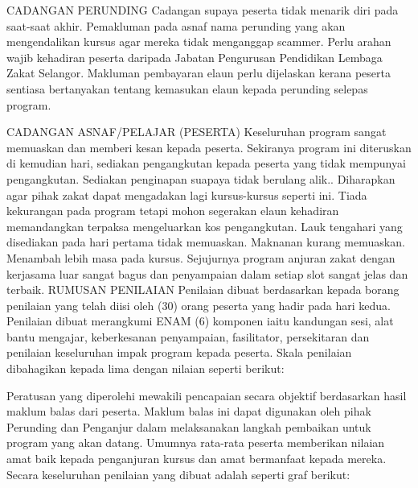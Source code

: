 CADANGAN PERUNDING
Cadangan supaya peserta tidak menarik diri pada saat-saat akhir.
Pemakluman pada asnaf nama perunding yang akan mengendalikan kursus agar mereka tidak menganggap scammer.
Perlu arahan wajib kehadiran peserta daripada Jabatan Pengurusan Pendidikan Lembaga Zakat Selangor.
Makluman pembayaran elaun perlu dijelaskan kerana peserta sentiasa bertanyakan tentang kemasukan elaun kepada perunding selepas program.


CADANGAN ASNAF/PELAJAR (PESERTA)
Keseluruhan program sangat memuaskan dan memberi kesan kepada peserta.
Sekiranya program ini diteruskan di kemudian hari, sediakan pengangkutan kepada peserta yang tidak mempunyai pengangkutan.
Sediakan penginapan suapaya tidak berulang alik..
Diharapkan agar pihak zakat dapat mengadakan lagi kursus-kursus seperti ini.
Tiada kekurangan pada program tetapi mohon segerakan elaun kehadiran memandangkan terpaksa mengeluarkan kos pengangkutan.
Lauk tengahari yang disediakan pada hari pertama tidak memuaskan.
Maknanan kurang memuaskan.
Menambah lebih masa pada kursus.
Sejujurnya program anjuran zakat dengan kerjasama luar sangat bagus dan penyampaian dalam setiap slot sangat jelas dan terbaik.
RUMUSAN PENILAIAN
Penilaian dibuat berdasarkan kepada borang penilaian yang telah diisi oleh (30) orang peserta yang hadir pada hari kedua. Penilaian dibuat merangkumi ENAM (6) komponen iaitu kandungan sesi, alat bantu mengajar, keberkesanan penyampaian, fasilitator, persekitaran dan penilaian keseluruhan impak program kepada peserta. Skala penilaian dibahagikan kepada lima dengan nilaian seperti berikut:

Peratusan yang diperolehi mewakili pencapaian secara objektif berdasarkan hasil maklum balas dari peserta. Maklum balas ini dapat digunakan oleh pihak Perunding dan Penganjur dalam melaksanakan langkah pembaikan untuk program yang akan datang. Umumnya rata-rata peserta memberikan nilaian amat baik kepada penganjuran kursus dan amat bermanfaat kepada mereka. Secara keseluruhan penilaian yang dibuat adalah seperti graf berikut:


























